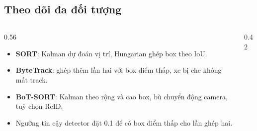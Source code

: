 \documentclass[aspectratio=\mlwAspectRatio, \mlwBaseSize, t]{beamer}
\begin{document}
\subsection{Theo dõi đa đối tượng}
\begin{frame}{\stitle}
  \begin{columns}[T]
    \begin{column}{0.56\textwidth}
      \begin{itemize}
        \item \textbf{SORT}: Kalman dự đoán vị trí, Hungarian ghép box theo IoU.
        \item \textbf{ByteTrack}: ghép thêm lần hai với box điểm thấp, xe bị che không mất
              track.
        \item \textbf{BoT-SORT}: Kalman theo rộng và cao box, bù chuyển động camera, tuỳ chọn
              ReID.
        \item Ngưỡng tin cậy detector đặt \alert{0.1} để có box điểm thấp cho lần ghép hai.
      \end{itemize}
    \end{column}
    \begin{column}{0.42\textwidth}
      \centering
    \end{column}
  \end{columns}
  \vspace{0.1em}
  \centering
\end{frame}
\end{document}
